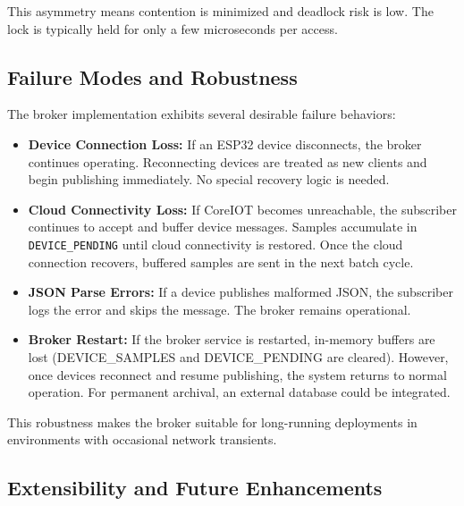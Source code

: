 This asymmetry means contention is minimized and deadlock risk is low. The lock is typically held for only a few microseconds per access.

\subsection*{Failure Modes and Robustness}

The broker implementation exhibits several desirable failure behaviors:
\begin{itemize}
  \item \textbf{Device Connection Loss:} If an ESP32 device disconnects, the broker continues operating. Reconnecting devices are treated as new clients and begin publishing immediately. No special recovery logic is needed.
  \item \textbf{Cloud Connectivity Loss:} If CoreIOT becomes unreachable, the subscriber continues to accept and buffer device messages. Samples accumulate in \texttt{DEVICE\_PENDING} until cloud connectivity is restored. Once the cloud connection recovers, buffered samples are sent in the next batch cycle.
  \item \textbf{JSON Parse Errors:} If a device publishes malformed JSON, the subscriber logs the error and skips the message. The broker remains operational.
  \item \textbf{Broker Restart:} If the broker service is restarted, in-memory buffers are lost (DEVICE\_SAMPLES and DEVICE\_PENDING are cleared). However, once devices reconnect and resume publishing, the system returns to normal operation. For permanent archival, an external database could be integrated.
\end{itemize}

This robustness makes the broker suitable for long-running deployments in environments with occasional network transients.

\subsection*{Extensibility and Future Enhancements}

